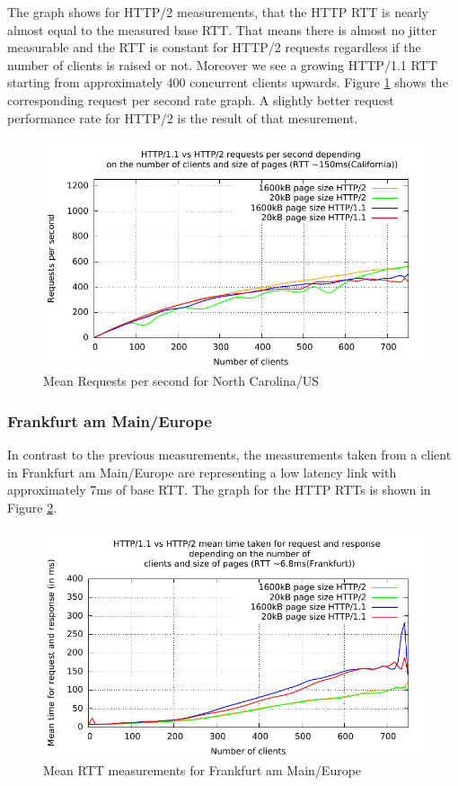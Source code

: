 The graph shows for HTTP/2 measurements, that the HTTP RTT is nearly almost equal to the measured base RTT. That means there is almost no jitter measurable and the RTT is constant for HTTP/2 requests regardless if the number of clients is raised or not. Moreover we see a growing HTTP/1.1 RTT starting from approximately 400 concurrent clients upwards. Figure \ref{fig:reqps-na} shows the corresponding request per second rate graph. A slightly better request performance rate for HTTP/2 is the result of that mesurement.

\begin{figure}[H]
	\centering
	\includegraphics[scale=1,trim=0.0cm .0cm .0cm .0cm,clip]{images/reqps-na.pdf}
	\caption{Mean Requests per second for North Carolina/US}
	\label{fig:reqps-na}
\end{figure} 

\subsubsection{Frankfurt am Main/Europe}

In contrast to the previous measurements, the measurements taken from a client in Frankfurt am Main/Europe are representing a low latency link with approximately 7ms of base RTT. The graph for the HTTP RTTs is shown in Figure \ref{fig:latency-europe}.

\begin{figure}[H]
	\centering
	\includegraphics[scale=1,trim=0.0cm .0cm .0cm .0cm,clip]{images/latency-frankfurt.pdf}
	\caption{Mean RTT measurements for Frankfurt am Main/Europe}
	\label{fig:latency-europe}
\end{figure}

